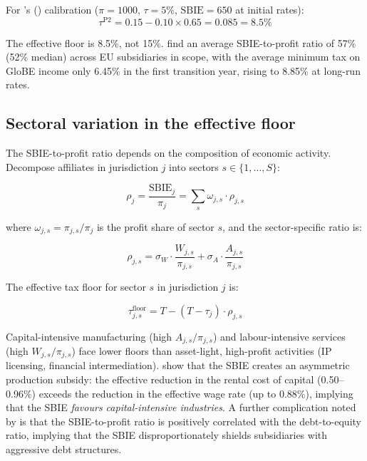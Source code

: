 \documentclass[11pt,a4paper]{article}
\begin{document}
For \citeauthor{schjelderup2024}'s (\citeyear{schjelderup2024}) calibration ($\pi = 1000$, $\tau = 5\%$, $\text{SBIE} = 650$ at initial rates):
\[
\tau^{\text{P2}} = 0.15 - 0.10 \times 0.65 = 0.085 = 8.5\%
\]

The effective floor is 8.5\%, not 15\%. \citet{devereux2023} find an average SBIE-to-profit ratio of 57\% (52\% median) across EU subsidiaries in scope, with the average minimum tax on GloBE income only 6.45\% in the first transition year, rising to 8.85\% at long-run rates.

\subsection{Sectoral variation in the effective floor}\label{sec:floor_sectoral}

The SBIE-to-profit ratio depends on the composition of economic activity. Decompose affiliates in jurisdiction $j$ into sectors $s \in \{1, \ldots, S\}$:

\begin{equation}\label{eq:rho_sectoral}
\rho_j = \frac{\text{SBIE}_j}{\pi_j} = \sum_s \omega_{j,s} \cdot \rho_{j,s}
\end{equation}

where $\omega_{j,s} = \pi_{j,s} / \pi_j$ is the profit share of sector $s$, and the sector-specific ratio is:

\begin{equation}\label{eq:rho_sector}
\rho_{j,s} = \sigma_W \cdot \frac{W_{j,s}}{\pi_{j,s}} + \sigma_A \cdot \frac{A_{j,s}}{\pi_{j,s}}
\end{equation}

The effective tax floor for sector $s$ in jurisdiction $j$ is:

\begin{equation}\label{eq:floor_sector}
\tau_{j,s}^{\text{floor}} = T - (T - \tau_j) \cdot \rho_{j,s}
\end{equation}

Capital-intensive manufacturing (high $A_{j,s}/\pi_{j,s}$) and labour-intensive services (high $W_{j,s}/\pi_{j,s}$) face lower floors than asset-light, high-profit activities (IP licensing, financial intermediation). \citet{schjelderup2024} show that the SBIE creates an asymmetric production subsidy: the effective reduction in the rental cost of capital (0.50--0.96\%) exceeds the reduction in the effective wage rate (up to 0.88\%), implying that the SBIE \emph{favours capital-intensive industries}. A further complication noted by \citet{devereux2023} is that the SBIE-to-profit ratio is positively correlated with the debt-to-equity ratio, implying that the SBIE disproportionately shields subsidiaries with aggressive debt structures.
\end{document}
